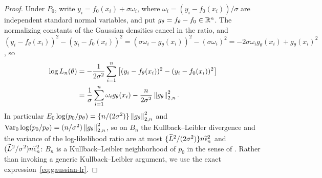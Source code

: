 \begin{proof}
Under $P_0$, write $y_i=f_0(x_i)+\sigma \omega_i$, where $\omega_i=(y_i-f_0(x_i))/\sigma$ are independent standard normal variables, and put $g_\theta=f_\theta-f_0\in\mathbb{R}^n$. The normalizing constants of the Gaussian densities cancel in the ratio, and $(y_i-f_\theta(x_i))^2-(y_i-f_0(x_i))^2=(\sigma \omega_i-g_\theta(x_i))^2-(\sigma \omega_i)^2=-2\sigma \omega_ig_\theta(x_i)+g_\theta(x_i)^2$, so
\begin{align}
\log L_n(\theta)
&=-\frac1{2\sigma^2}\sum_{i=1}^n
\left[(y_i-f_\theta(x_i))^2-(y_i-f_0(x_i))^2\right]\notag\\
&=\frac1\sigma\sum_{i=1}^n\omega_ig_\theta(x_i)-\frac{n}{2\sigma^2}\left\lVert g_\theta \right\rVert_{2,n}^2 .
\label{eq:gaussian-lr}
\end{align}
In particular $E_0\log(p_0/p_\theta)=\{n/(2\sigma^2)\}\left\lVert g_\theta \right\rVert_{2,n}^2$ and $\operatorname{Var}_0\log(p_0/p_\theta)=(n/\sigma^2)\left\lVert g_\theta \right\rVert_{2,n}^2$, so on $B_n$ the Kullback--Leibler divergence and the variance of the log-likelihood ratio are at most $\{\widetilde L^2/(2\sigma^2)\}n\widetilde{\epsilon}_n^2$ and $(\widetilde L^2/\sigma^2)n\widetilde{\epsilon}_n^2$: $B_n$ is a Kullback--Leibler neighborhood of $p_0$ in the sense of \citet{Ghosal2000}. Rather than invoking a generic Kullback--Leibler argument, we use the exact expression~\eqref{eq:gaussian-lr}.


\end{proof}
